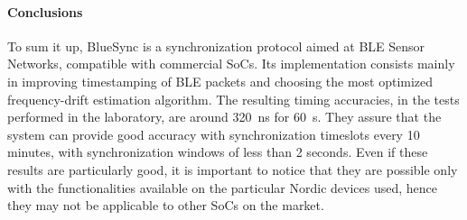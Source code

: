 \paragraph{Conclusions} To sum it up, BlueSync is a synchronization protocol aimed at BLE Sensor Networks, compatible with commercial SoCs. Its implementation consists mainly in improving timestamping of BLE packets and choosing the most optimized frequency-drift estimation algorithm. The resulting timing accuracies, in the tests performed in the laboratory, are around 320~ns for 60~s. They assure that the system can provide good accuracy with synchronization timeslots every 10 minutes, with synchronization windows of less than 2 seconds. Even if these results are particularly good, it is important to notice that they are possible only with the functionalities available on the particular Nordic devices used, hence they may not be applicable to other SoCs on the market. 
